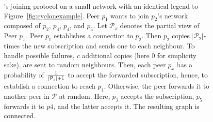 \begin{figure}
  \centering
  
  \caption{\label{fig:scampexample} \SCAMP{}'s joining protocol on a small
    network with an identical legend to Figure~\ref{fig:cyclonexample}. Peer
    $p_1$ wants to join $p_2$'s network composed of $p_2$, $p_3$, $p_4$, and
    $p_5$. Let $\mathcal{P}_x$ denotes the partial view of Peer $p_x$. Peer
    $p_1$ establishes a connection to $p_2$. Then $p_2$ copies
    $|\mathcal{P}_2|$-times the new subscription and sends one to each
    neighbour. To handle possible failures, $c$ additional copies (here $0$ for
    simplicity sake), are sent to random neighbours. Then, each peer $p_x$ has
    a probability of $1\over{|\mathcal{P}_x|+1}$ to accept the forwarded
    subscription, hence, to establish a connection to reach $p_1$. Otherwise,
    the peer forwards it to another peer in $\mathcal{P}$ at random. Here,
    $p_3$ accepts the subscription, $p_5$ forwards it to $p4$, and the latter
    accepts it. The resulting graph is connected.}
\end{figure}

